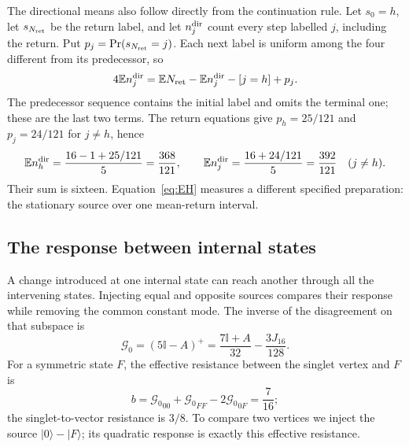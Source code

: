 \documentclass[aps,prx,onecolumn,10pt,notitlepage,nofootinbib,longbibliography]{revtex4-2}
\numberwithin{equation}{section}
\numberwithin{table}{section}
\newcommand{\Id}{\mathbb I}
\newcommand{\EE}{\mathbb E}
\begin{document}
The directional means also follow directly from the continuation rule. Let $s_0=h$, let $s_{N_{\rm ret}}$ be the return label, and let $n_j^{\rm dir}$ count every step labelled $j$, including the return. Put $p_j=\Pr(s_{N_{\rm ret}}=j)$. Each next label is uniform among the four different from its predecessor, so
\begin{equation}
 4\EE n_j^{\rm dir}=\EE N_{\rm ret}-\EE n_j^{\rm dir}-[j=h]+p_j.
 \label{eq:excursiondirection}
\end{equation}
The predecessor sequence contains the initial label and omits the terminal one; these are the last two terms. The return equations give $p_h=25/121$ and $p_j=24/121$ for $j\ne h$, hence
\begin{equation}
 \EE n_h^{\rm dir}=\frac{16-1+25/121}{5}=\frac{368}{121},\qquad
 \EE n_j^{\rm dir}=\frac{16+24/121}{5}=\frac{392}{121}\quad(j\ne h).
\end{equation}
Their sum is sixteen. Equation~\eqref{eq:EH} measures a different specified preparation: the stationary source over one mean-return interval.

\subsection{The response between internal states}
\label{sec:internalgreen}
A change introduced at one internal state can reach another through all the intervening states. Injecting equal and opposite sources compares their response while removing the common constant mode. The inverse of the disagreement on that subspace is
\begin{equation}
 {\mathcal G_0}=(5\Id-A)^+=\frac{7\Id+A}{32}-\frac{3J_{16}}{128}.
 \label{eq:green}
\end{equation}
For a symmetric state $F$, the effective resistance between the singlet vertex and $F$ is
\begin{equation}
 b={\mathcal G_0}_{00}+{\mathcal G_0}_{FF}-2{\mathcal G_0}_{0F}=\frac7{16};
\end{equation}
the singlet-to-vector resistance is $3/8$. To compare two vertices we inject the source $\lvert0\rangle-\lvert F\rangle$; its quadratic response is exactly this effective resistance.
\end{document}
